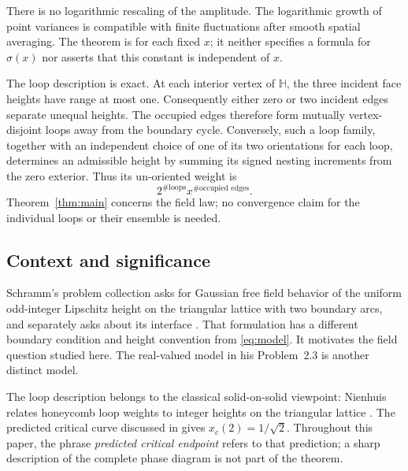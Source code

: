\documentclass[11pt]{article}
\theoremstyle{definition}
\theoremstyle{remark}
\numberwithin{equation}{section}
\begin{document}
There is no logarithmic rescaling of the amplitude.  The logarithmic growth
of point variances \cite[Section~1.2.4]{GL2025} is compatible with finite fluctuations after smooth
spatial averaging.  The theorem is for each fixed $x$; it neither specifies
a formula for $\sigma(x)$ nor asserts that this constant is independent of
$x$.

The loop description is exact.  At each interior vertex of $\mathbb H$, the
three incident face heights have range at most one.  Consequently either
zero or two incident edges separate unequal heights.  The occupied edges
therefore form mutually vertex-disjoint loops away from the boundary
cycle.  Conversely, such a loop family, together with an independent
choice of one of its two orientations for each loop, determines an
admissible height by summing its signed nesting increments from the zero
exterior.  Thus its un-oriented weight is
\begin{equation}\label{eq:loop-weight}
 2^{\#\text{loops}}x^{\#\text{occupied edges}}.
\end{equation}
Theorem~\ref{thm:main} concerns the field law; no convergence claim for the
individual loops or their ensemble is needed.

\subsection{Context and significance}

Schramm's problem collection asks for Gaussian free field behavior of the
uniform odd-integer Lipschitz height on the triangular lattice with two
boundary arcs, and separately asks about its interface
\cite[Problem~2.2]{Schramm2007}.  That formulation has a different boundary
condition and height convention from \eqref{eq:model}.  It motivates the
field question studied here.  The real-valued model in his Problem~2.3 is
another distinct model.

The loop description belongs to the classical solid-on-solid viewpoint:
Nienhuis relates honeycomb loop weights to integer heights on the
triangular lattice \cite[p.~1062]{Nienhuis1982}.
The predicted critical curve discussed in
\cite[Section~1.4.1]{GL2025} gives $x_c(2)=1/\sqrt2$.
Throughout this paper, the phrase \emph{predicted critical endpoint}
refers to that prediction; a sharp description of the complete phase
diagram is not part of the theorem.
\end{document}
